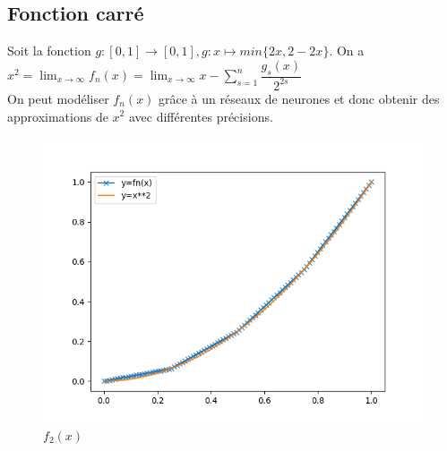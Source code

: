 \documentclass[a4paper,11pt,twoside]{report}
\begin{document}
	\subsection{Fonction carré}
	Soit la fonction $g:[0,1]\rightarrow[0, 1], g:x\mapsto min\{2x, 2-2x\}$.
	On a $x^2 = \lim_{x\to\infty} f_n(x)= \lim_{x\to\infty} x - \sum_{s=1}^{n}\dfrac{g_s(x)}{2^{2s}}$\\
	
	On peut modéliser $f_n(x)$ grâce à un réseaux de neurones et donc obtenir des approximations de $x^2$ avec différentes précisions.\\ 
	
	\begin{figure}[H]
		\begin{center}
			\includegraphics[width=0.7\linewidth]{square_n2.png}
			\caption{$f_2(x)$}
		\end{center}
	\end{figure}
	
\end{document}
